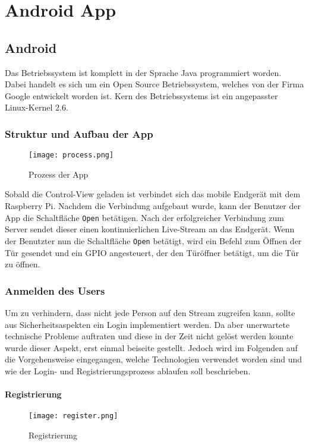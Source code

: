 
\chapter{Android App}
\section{Android}
Das Betriebssystem ist komplett in der Sprache Java programmiert worden. Dabei handelt es sich um ein Open Source Betriebssystem, welches von der Firma Google entwickelt worden ist. Kern des Betriebssystems ist ein angepasster Linux-Kernel 2.6. 
\subsection{Struktur und Aufbau der App}

\begin{figure}[h]
  \begin{center}
    \texttt{[image: process.png]}
  		  \caption{Prozess der App}
     \label{fig.Prozess}
  \end{center}
\end{figure}
Sobald die Control-View geladen ist verbindet sich das mobile Endgerät mit dem Raspberry Pi. Nachdem die Verbindung aufgebaut wurde, kann der Benutzer der App die Schaltfläche \texttt{Open} betätigen. Nach der erfolgreicher Verbindung zum Server sendet dieser einen kontinuierlichen Live-Stream an das Endgerät. Wenn der Benutzter nun die Schaltfläche \texttt{Open} betätigt, wird ein Befehl zum Öffnen der Tür gesendet und ein GPIO angesteuert, der den Türöffner betätigt, um die Tür zu öffnen.

\subsection{Anmelden des Users}
Um zu verhindern, dass nicht jede Person auf den Stream zugreifen kann, sollte aus Sicherheitsaspekten ein Login implementiert werden. Da aber unerwartete technische Probleme auftraten und diese in der Zeit nicht gelöst werden konnte wurde dieser Aspekt, erst einmal beiseite gestellt.
Jedoch wird im Folgenden auf die Vorgehensweise eingegangen, welche Technologien verwendet worden sind und wie der Login- und Registrierungsprozess ablaufen soll beschrieben.

\subsubsection{Registrierung}
\begin{figure}[h]
  \begin{center}
    \texttt{[image: register.png]}
  		  \caption{Registrierung}
     \label{fig.Prozess}
  \end{center}
\end{figure}

